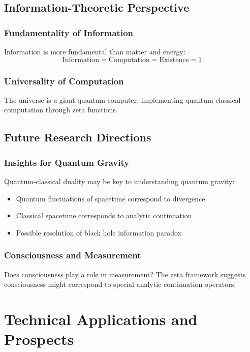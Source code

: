 \documentclass[11pt]{article}
\theoremstyle{plain}
\theoremstyle{definition}
\theoremstyle{remark}
\begin{document}
\subsection{Information-Theoretic Perspective}

\subsubsection{Fundamentality of Information}

Information is more fundamental than matter and energy:
$$\text{Information} = \text{Computation} = \text{Existence} = 1$$

\subsubsection{Universality of Computation}

The universe is a giant quantum computer, implementing quantum-classical computation through zeta functions.

\subsection{Future Research Directions}

\subsubsection{Insights for Quantum Gravity}

Quantum-classical duality may be key to understanding quantum gravity:
\begin{itemize}
\item Quantum fluctuations of spacetime correspond to divergence
\item Classical spacetime corresponds to analytic continuation
\item Possible resolution of black hole information paradox
\end{itemize}

\subsubsection{Consciousness and Measurement}

Does consciousness play a role in measurement? The zeta framework suggests consciousness might correspond to special analytic continuation operators.

\section{Technical Applications and Prospects}
\end{document}
